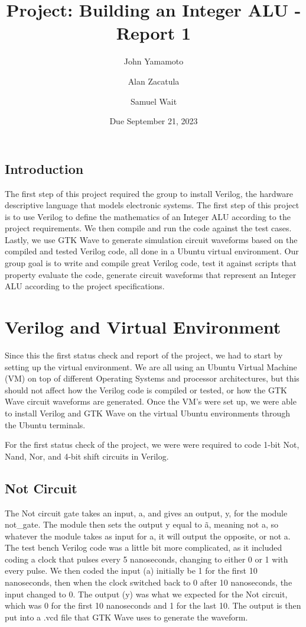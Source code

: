 \documentclass[runningheads, 12pt]{report}
\begin{document}
	
	\title{Project: Building an Integer ALU - Report 1}
	\author{John Yamamoto 
		\and Alan Zacatula
		\and  Samuel Wait}
	\date{Due September 21, 2023}

	\maketitle
	
	\section{Introduction}
	
	The first step of this project required the group to install Verilog, the hardware descriptive language that models electronic systems. The first step of this project is to use Verilog to define the mathematics of an Integer ALU according to the project requirements. We then compile and run the code against the test cases. Lastly, we use GTK Wave to generate simulation circuit waveforms based on the compiled and tested Verilog code, all done in a Ubuntu virtual environment. Our group goal is to write and compile great Verilog code, test it against scripts that property evaluate the code, generate circuit waveforms that represent an Integer ALU according to the project specifications. 
	
	\chapter{Verilog and Virtual Environment}
	
	Since this the first status check and report of the project, we had to start by setting up the virtual environment. We are all using an Ubuntu Virtual Machine (VM)  on top of different Operating Systems and processor architectures, but this should not affect how the Verilog code is compiled or tested, or how the GTK Wave circuit waveforms are generated. Once the VM's were set up, we were able to install Verilog and GTK Wave on the virtual Ubuntu environments through the Ubuntu terminals.
	
For the first status check of the project, we were were required to code 1-bit Not, Nand, Nor, and 4-bit shift circuits in Verilog. 
	
		\section{Not Circuit}
	
	The Not circuit gate takes an input, a, and gives an output, y, for the module not\_gate. The module then sets the output y equal to \~a, meaning not a, so whatever the module takes as input for a, it will output the opposite, or not a. The test bench Verilog code was a little bit more complicated, as it included coding a clock that pulses every 5 nanoseconds, changing to either 0 or 1 with every pulse. We then coded the input (a) initially be 1 for the first 10 nanoseconds, then when the clock switched back to 0 after 10 nanoseconds, the input changed to 0. The output (y) was what we expected for the Not circuit, which was 0 for the first 10 nanoseconds and 1 for the last 10. The output is then put into a .vcd file that GTK Wave uses to generate the waveform.
	
\end{document}

